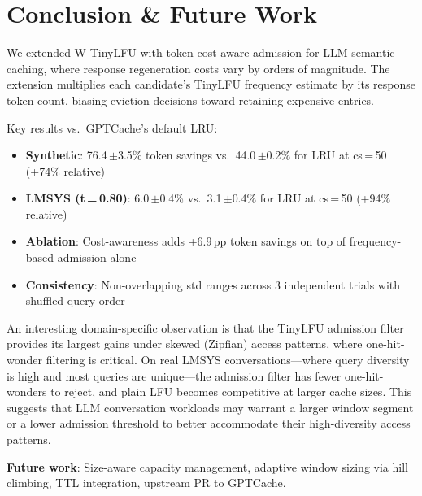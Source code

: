 \documentclass[11pt,a4paper]{article}
\begin{document}
\section{Conclusion \& Future Work}
\label{sec:conclusion}

We extended W-TinyLFU with token-cost-aware admission for LLM semantic caching, where response regeneration costs vary by orders of magnitude.
The extension multiplies each candidate's TinyLFU frequency estimate by its response token count, biasing eviction decisions toward retaining expensive entries.

Key results vs.\ GPTCache's default LRU:

\begin{itemize}[nosep]
  \item \textbf{Synthetic}: 76.4\,{\small$\pm$3.5}\% token savings vs.\ 44.0\,{\small$\pm$0.2}\% for LRU at cs\,=\,50 (+74\% relative)
  \item \textbf{LMSYS (t\,=\,0.80)}: 6.0\,{\small$\pm$0.4}\% vs.\ 3.1\,{\small$\pm$0.4}\% for LRU at cs\,=\,50 (+94\% relative)
  \item \textbf{Ablation}: Cost-awareness adds +6.9\,pp token savings on top of frequency-based admission alone
  \item \textbf{Consistency}: Non-overlapping std ranges across 3 independent trials with shuffled query order
\end{itemize}

An interesting domain-specific observation is that the TinyLFU admission filter provides its largest gains under skewed (Zipfian) access patterns, where one-hit-wonder filtering is critical.
On real LMSYS conversations---where query diversity is high and most queries are unique---the admission filter has fewer one-hit-wonders to reject, and plain LFU becomes competitive at larger cache sizes.
This suggests that LLM conversation workloads may warrant a larger window segment or a lower admission threshold to better accommodate their high-diversity access patterns.

\textbf{Future work}: Size-aware capacity management, adaptive window sizing via hill climbing, TTL integration, upstream PR to GPTCache.
\end{document}
